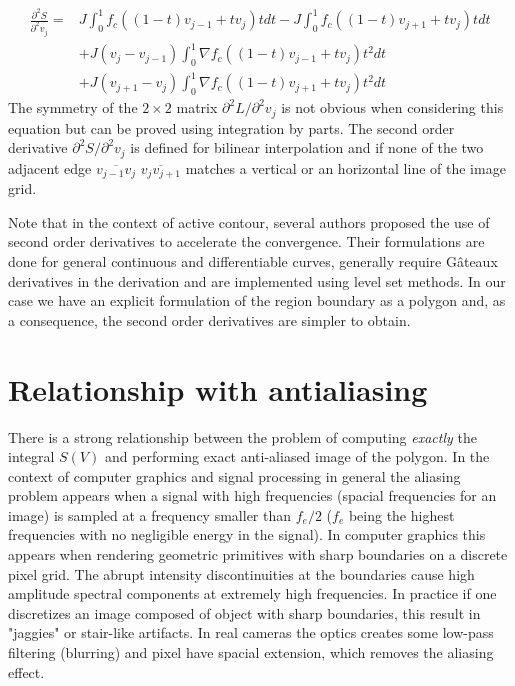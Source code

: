 \documentclass[11pt]{article}
\begin{document}
\begin{equation}
\begin{split}
\frac{\partial^2 S}{\partial^2 v_j}=&J\int_0^1 f_c((1-t)v_{j-1}+tv_j)tdt-J\int_0^1 f_c((1-t)v_{j+1}+tv_{j})tdt\\
&+J(v_j-v_{j-1})\int_0^1 \nabla f_c((1-t)v_{j-1}+tv_j)t^2dt\\
&+J(v_{j+1}-v_{j})\int_0^1 \nabla f_c((1-t)v_{j+1}+tv_{j})t^2dt
\end{split}
\label{eqn:second_order_derivative_qjqj}
\end{equation}
The symmetry of the $2\times 2$ matrix ${\partial^2 L}/{\partial^2 v_j}$ is not obvious when considering this equation but can be proved using integration by parts.
The second order derivative ${\partial^2 S}/{\partial^2 v_{j}}$  is defined for bilinear interpolation and if none of the two adjacent edge $\overline{v_{j-1}v_j}$ $\overline{v_j v_{j+1}}$  matches a vertical or an horizontal line of the  image grid.    


 
 Note that in the context of active contour, several authors \cite{Hintermuller2004a,Burger2003,Hintermuller2004b,Bar2009} proposed the use of second order derivatives to accelerate the convergence.
Their formulations are done for general continuous and differentiable curves, generally require G\^ateaux derivatives in the derivation and are implemented using level set methods. In our case we have an explicit formulation of the region boundary as a polygon and, as a consequence, the second order derivatives are simpler to obtain.
%

\section{Relationship with antialiasing}

There is a strong relationship between the problem of computing \emph{exactly} the integral $S(V)$ and performing exact anti-aliased image of the polygon. In the context of computer graphics and signal processing in general the aliasing problem appears when a signal with high frequencies (spacial frequencies for an image) is sampled at a frequency smaller than $f_e/2$ ($f_e$ being the highest frequencies with no negligible energy in the signal). In computer graphics this appears when rendering geometric primitives with sharp boundaries on a discrete pixel grid. The abrupt intensity discontinuities at the boundaries cause high amplitude spectral components at extremely high frequencies.
 In practice if one discretizes an image composed of object with sharp boundaries, this result in "jaggies" or stair-like artifacts. In real cameras the optics creates some low-pass filtering (blurring) and pixel have spacial extension, which removes the aliasing effect. 
 
\end{document}
